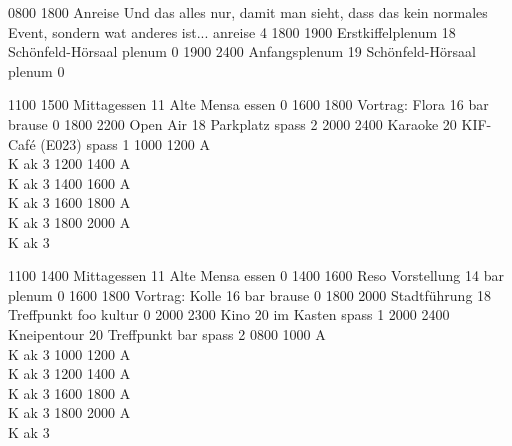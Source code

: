 \documentclass[a5paper,9pt]{scrreprt}
\begin{document}
\begin{center}
\begin{timetable}
   {0800} {1800} {Anreise}
    {Und das alles nur, damit man sieht, dass das kein normales Event, sondern
    wat anderes ist...}
    {} {} {anreise}  {4}
   {1800} {1900} {Erstkiffelplenum} {18} {Schönfeld-Hörsaal} {} {plenum}  {0}
   {1900} {2400} {Anfangsplenum}    {19} {Schönfeld-Hörsaal} {} {plenum}  {0}

   {1100} {1500} {Mittagessen}      {11} {Alte Mensa}        {} {essen}   {0}
   {1600} {1800} {Vortrag: Flora}   {16} {bar}               {} {brause}  {0}
   {1800} {2200} {Open Air}         {18} {Parkplatz}         {} {spass}   {2}
   {2000} {2400} {Karaoke}          {20} {KIF-Café (E023)}   {} {spass}   {1}
   {1000} {1200} {\hfill A\\ \hfill K} {} {}               {} {ak}      {3}
   {1200} {1400} {\hfill A\\ \hfill K} {} {}               {} {ak}      {3}
   {1400} {1600} {\hfill A\\ \hfill K} {} {}               {} {ak}      {3}
   {1600} {1800} {\hfill A\\ \hfill K} {} {}               {} {ak}      {3}
   {1800} {2000} {\hfill A\\ \hfill K} {} {}               {} {ak}      {3}
  
   {1100} {1400} {Mittagessen}      {11} {Alte Mensa}        {} {essen}   {0}
   {1400} {1600} {Reso Vorstellung} {14} {bar}               {} {plenum}  {0}
   {1600} {1800} {Vortrag: Kolle}   {16} {bar}               {} {brause}  {0}
   {1800} {2000} {Stadtführung}     {18} {Treffpunkt foo}    {} {kultur}  {0}
   {2000} {2300} {Kino}             {20} {im Kasten}         {} {spass}   {1}
   {2000} {2400} {Kneipentour}      {20} {Treffpunkt bar}    {} {spass}   {2}
   {0800} {1000} {\hfill A\\ \hfill K} {} {}               {} {ak}      {3}
   {1000} {1200} {\hfill A\\ \hfill K} {} {}               {} {ak}      {3}
   {1200} {1400} {\hfill A\\ \hfill K} {} {}               {} {ak}      {3}
   {1600} {1800} {\hfill A\\ \hfill K} {} {}               {} {ak}      {3}
   {1800} {2000} {\hfill A\\ \hfill K} {} {}               {} {ak}      {3}


\end{timetable}
\end{center}
\end{document}
